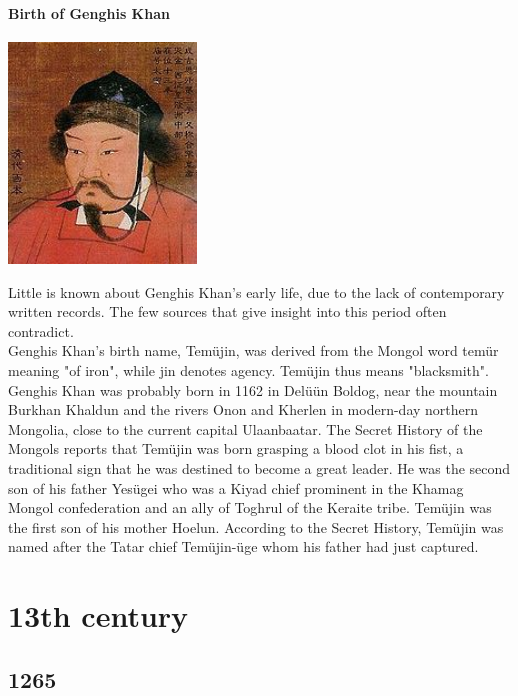 \documentclass[11pt]{report}
\begin{document}
\subsection{Birth of Genghis Khan}
\vspace{2mm}\begin{center}\includegraphics[width=5cm]{./img/gengishKhan.jpg}\end{center}
Little is known about Genghis Khan's early life, due to the lack of contemporary written records. The few sources that give insight into this period often contradict.\\
Genghis Khan's birth name, Temüjin, was derived from the Mongol word temür meaning "of iron", while jin denotes agency. Temüjin thus means "blacksmith".\\
Genghis Khan was probably born in 1162 in Delüün Boldog, near the mountain Burkhan Khaldun and the rivers Onon and Kherlen in modern-day northern Mongolia, close to the current capital Ulaanbaatar. The Secret History of the Mongols reports that Temüjin was born grasping a blood clot in his fist, a traditional sign that he was destined to become a great leader. He was the second son of his father Yesügei who was a Kiyad chief prominent in the Khamag Mongol confederation and an ally of Toghrul of the Keraite tribe. Temüjin was the first son of his mother Hoelun. According to the Secret History, Temüjin was named after the Tatar chief Temüjin-üge whom his father had just captured.

					
\part{13th century}
\chapter{1265}
\section{}
\end{document}
